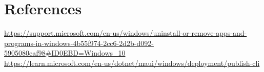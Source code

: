 \section{References}
\href{https://support.microsoft.com/en-us/windows/uninstall-or-remove-apps-and-programs-in-windows-4b55f974-2cc6-2d2b-d092-5905080eaf98#ID0EBD=Windows_10}{https://support.microsoft.com/en-us/windows/uninstall-or-remove-apps-and-programs-in-windows-4b55f974-2cc6-2d2b-d092-5905080eaf98\#ID0EBD=Windows\_10}\\
\href{https://learn.microsoft.com/en-us/dotnet/maui/windows/deployment/publish-cli}{https://learn.microsoft.com/en-us/dotnet/maui/windows/deployment/publish-cli}
